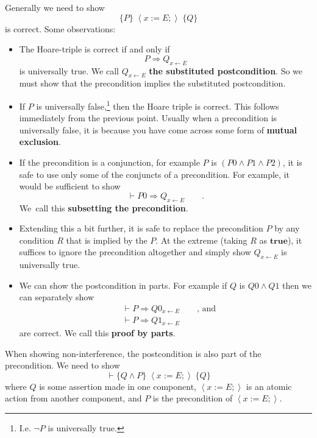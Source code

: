 \documentclass[muchmore,11pt]{article}%
\begin{document}
Generally we need to show%
\[
\{P\}\;\left\langle x:=E;\right\rangle \;\{Q\}
\]
is correct. Some observations:

\begin{itemize}
\item The Hoare-triple is correct if and only if%
\[
P\Rightarrow Q_{x\leftarrow E}%
\]
is universally true. We call $Q_{x\leftarrow E}$ \textbf{the substituted
postcondition}. So we must show that the precondition implies the substituted postcondition.

\item If $P$ is universally false,\footnote{I.e. $\lnot P$ is universally
true.} then the Hoare triple is correct. This follows immediately from the
previous point. Usually when a precondition is universally false, it is
because you have come across some form of \textbf{mutual exclusion}.

\item If the precondition is a conjunction, for example $P$ is $\left(
P0\wedge P1\wedge P2\right)  $, it is safe to use only some of the conjuncts
of a precondition. For example, it would be sufficient to show%
\[
\vdash P0\Rightarrow Q_{x\leftarrow E}\qquad\text{.}%
\]
We\ call this \textbf{subsetting the precondition}.

\item Extending this a bit further, it is safe to replace the precondition $P$
by any condition $R$ that is implied by the $P$. At the extreme (taking $R$ as
$\mathbf{true}$), it suffices to ignore the precondition altogether and simply
show $Q_{x\leftarrow E}$ is universally true.

\item We can show the postcondition in parts. For example if $Q$ is $Q0\wedge
Q1$ then we can separately show%
\begin{align*}
&  \vdash P\Rightarrow Q0_{x\leftarrow E}\qquad\text{, and}\\
&  \vdash P\Rightarrow Q1_{x\leftarrow E}%
\end{align*}
are correct. We call this \textbf{proof by parts}.
\end{itemize}

When showing non-interference, the postcondition is also part of the
precondition. We need to show%
\[
\vdash\{Q\wedge P\}\;\left\langle x:=E;\right\rangle \;\{Q\}
\]
where $Q$ is some assertion made in one component, $\left\langle
x:=E;\right\rangle $ is an atomic action from another component, and $P$ is
the precondition of $\left\langle x:=E;\right\rangle $.
\end{document}
